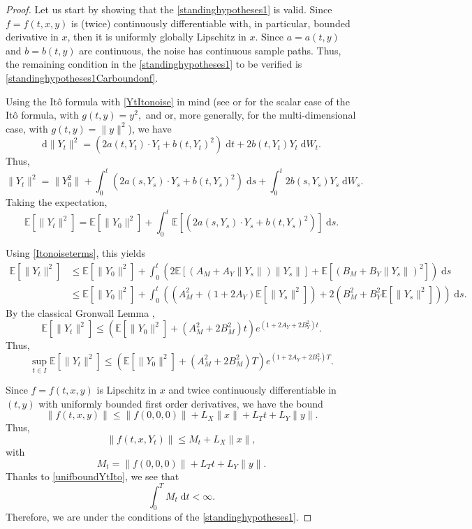 \documentclass[reqno,12pt]{amsart}
\theoremstyle{plain} %
\theoremstyle{definition} %
\begin{document}
\begin{proof}
    Let us start by showing that the \cref{standinghypotheses1} is valid. Since $f=f(t, x, y)$ is (twice) continuously differentiable with, in particular, bounded derivative in $x$, then it is uniformly globally Lipschitz in $x$. Since $a=a(t, y)$ and $b=b(t, y)$ are continuous, the noise has continuous sample paths. Thus, the remaining condition in the \cref{standinghypotheses1} to be verified is \eqref{standinghypotheses1Carboundonf}.

    Using the It\^o formula with \eqref{YtItonoise} in mind (see \cite[Theorem 4.1.2]{Oksendal2003} or \cite[Section 7.4]{Kuo2006} for the scalar case of the It\^o formula, with $g(t, y) = y^2,$ and \cite[Theorem 4.2.1]{Oksendal2003} or, more generally, \cite[Section 7.5]{Kuo2006} for the multi-dimensional case, with $g(t, y) = \|y\|^2$), we have
    \[
        \mathrm{d}\|Y_t\|^2 = \left(2a(t, Y_t) \cdot Y_t  + b(t, Y_t)^2 \right) \;\mathrm{d}t + 2b(t, Y_t) Y_t\;\mathrm{d}W_t.
    \]
    Thus,
    \[
        \|Y_t\|^2 = \|Y_0^2\| + \int_0^t \left(2a(s, Y_s)\cdot Y_s  + b(t, Y_s)^2 \right) \;\mathrm{d}s + \int_0^t 2b(s, Y_s) Y_s\;\mathrm{d}W_s.
    \]
    Taking the expectation,
    \[
        \mathbb{E}[\|Y_t\|^2] = \mathbb{E}[\|Y_0\|^2] + \int_0^t \mathbb{E}\left[\left(2a(s, Y_s) \cdot Y_s  + b(t, Y_s)^2 \right)\right] \;\mathrm{d}s.
    \]

    
    Using \eqref{Itonoiseterms}, this yields
    \begin{align*}
        \mathbb{E}[\|Y_t\|^2] & \leq \mathbb{E}[\|Y_0\|^2] + \int_0^t \left(2\mathbb{E}[(A_M + A_Y \|Y_s\|) \|Y_s\|]  + \mathbb{E}[(B_M + B_Y\|Y_s\|)^2] \right) \;\mathrm{d}s \\
        & \leq \mathbb{E}[\|Y_0\|^2] + \int_0^t \left((A_M^2 + (1 + 2A_Y) \mathbb{E}[\|Y_s\|^2])  + 2(B_M^2 + B_Y^2\mathbb{E}[\|Y_s\|^2]) \right) \;\mathrm{d}s.
    \end{align*}
    By the classical Gronwall Lemma \cite{Gronwall1919},
    \[
        \mathbb{E}[\|Y_t\|^2] \leq \left( \mathbb{E}[\|Y_0\|^2] + (A_M^2 + 2B_M^2)t\right)e^{(1 + 2A_Y + 2B_Y^2)t}.
    \]
    Thus,
    \begin{equation}
        \label{unifboundYtIto}
        \sup_{t\in I}\mathbb{E}[\|Y_t\|^2] \leq \left( \mathbb{E}[\|Y_0\|^2] + (A_M^2 + 2B_M^2)T\right)e^{(1 + 2A_Y + 2B_Y^2)T}.
    \end{equation}

    Since $f=f(t, x, y)$ is Lipschitz in $x$ and twice continuously differentiable in $(t, y)$ with uniformly bounded first order derivatives, we have the bound
    \[
        \|f(t, x, y)\| \leq \|f(0, 0, 0)\| + L_X\|x\| + L_T t + L_Y\|y\|.
    \]
    Thus,
    \[
        \|f(t, x, Y_t)\| \leq M_t + L_X\|x\|,
    \]
    with
    \[
        M_t = \|f(0, 0, 0)\| + L_T t + L_Y\|y\|.
    \]
    Thanks to \eqref{unifboundYtIto}, we see that
    \[
        \int_0^T M_t\;\mathrm{d}t < \infty.
    \]
    Therefore, we are under the conditions of the \cref{standinghypotheses1}.


\end{proof}
\end{document}
